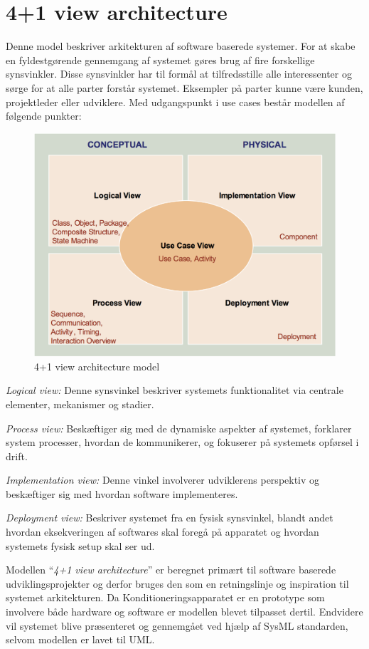 \section{4+1 view architecture} \label{title:viewArc}
Denne model beskriver arkitekturen af software baserede systemer. For at skabe en fyldestgørende gennemgang af systemet gøres brug af fire forskellige synsvinkler. Disse synsvinkler har til formål at  tilfredsstille alle interessenter og sørge for at alle parter forstår systemet. Eksempler på parter kunne være kunden, projektleder eller udviklere. Med udgangspunkt i use cases består modellen af følgende punkter: 

\begin{figure}[H]
	\includegraphics[width=\textwidth]{filer/4plus1model.png}
	\caption{4+1 view architecture model}\label{fig:4plus1model}
\end{figure}

\textit{Logical view:} Denne synsvinkel beskriver systemets funktionalitet via centrale elementer, mekanismer og stadier.

\textit{Process view:} Beskæftiger sig med de dynamiske aspekter af systemet, forklarer system processer, hvordan de kommunikerer, og fokuserer på systemets opførsel i drift.

\textit{Implementation view:} Denne vinkel involverer udviklerens perspektiv og beskæftiger sig med hvordan software implementeres.

\textit{Deployment view:} Beskriver systemet fra en fysisk synsvinkel, blandt andet hvordan eksekveringen af softwares skal foregå på apparatet og hvordan systemets fysisk setup skal ser ud. 

Modellen “\textit{4+1 view architecture}” er beregnet primært til software baserede udviklingsprojekter og derfor bruges den som en retningslinje og inspiration til systemet arkitekturen. Da Konditioneringsapparatet er en prototype som involvere både hardware og software er modellen blevet tilpasset dertil. Endvidere vil systemet blive præsenteret og gennemgået ved hjælp af SysML standarden, selvom modellen er lavet til UML.

